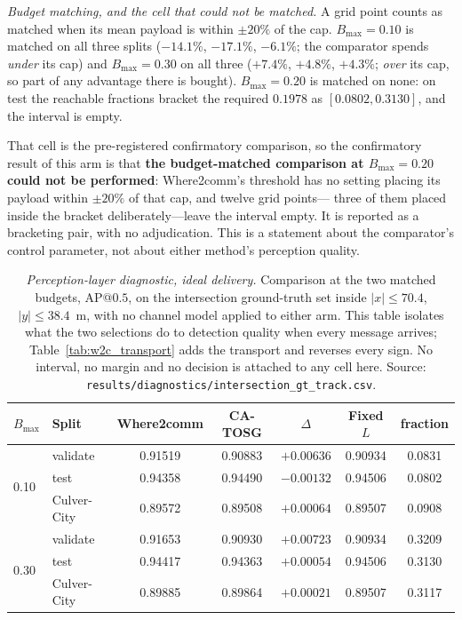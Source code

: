 \documentclass[journal]{IEEEtran}
\newcommand{\method}{CA-TOSG}
\begin{document}
\emph{Budget matching, and the cell that could not be matched.} A grid point counts as matched when
its mean payload is within $\pm20\%$ of the cap. $B_{\max}=0.10$ is matched on all three splits
($-14.1\%$, $-17.1\%$, $-6.1\%$; the comparator spends \emph{under} its cap) and $B_{\max}=0.30$ on
all three ($+7.4\%$, $+4.8\%$, $+4.3\%$; \emph{over} its cap, so part of any advantage there is
bought). $B_{\max}=0.20$ is matched on none: on test the reachable fractions bracket the required
$0.1978$ as $[0.0802, 0.3130]$, and the interval is empty.

That cell is the pre-registered confirmatory comparison, so the confirmatory result of this arm is
that \textbf{the budget-matched comparison at $B_{\max}=0.20$ could not be performed}: Where2comm's
threshold has no setting placing its payload within $\pm20\%$ of that cap, and twelve grid points---
three of them placed inside the bracket deliberately---leave the interval empty. It is reported as a
bracketing pair, with no adjudication. This is a statement about the comparator's control parameter,
not about either method's perception quality.

\begin{table}[t]
\centering
\footnotesize
\setlength{\tabcolsep}{3pt}
\caption{\emph{Perception-layer diagnostic, ideal delivery.} Comparison at the two matched budgets,
AP@$0.5$, on the intersection ground-truth set inside $|x|\le70.4$, $|y|\le38.4$~m, with no channel
model applied to either arm. This table isolates what the two selections do to detection quality
when every message arrives; Table~\ref{tab:w2c_transport} adds the transport and reverses every
sign. No interval, no margin and no decision is attached to any cell here. Source: \texttt{results/diagnostics/intersection\_gt\_track.csv}.}
\label{tab:w2c_descriptive}
\begin{tabular}{llccccc}
\toprule
$B_{\max}$ & Split & Where2comm & \method{} & $\Delta$ & Fixed $L$ & fraction \\
\midrule
\multirow{3}{*}{0.10}
 & validate    & 0.91519 & 0.90883 & $+0.00636$ & 0.90934 & 0.0831 \\
 & test        & 0.94358 & 0.94490 & $-0.00132$ & 0.94506 & 0.0802 \\
 & Culver-City & 0.89572 & 0.89508 & $+0.00064$ & 0.89507 & 0.0908 \\
\midrule
\multirow{3}{*}{0.30}
 & validate    & 0.91653 & 0.90930 & $+0.00723$ & 0.90934 & 0.3209 \\
 & test        & 0.94417 & 0.94363 & $+0.00054$ & 0.94506 & 0.3130 \\
 & Culver-City & 0.89885 & 0.89864 & $+0.00021$ & 0.89507 & 0.3117 \\
\bottomrule
\end{tabular}
\end{table}
\end{document}
